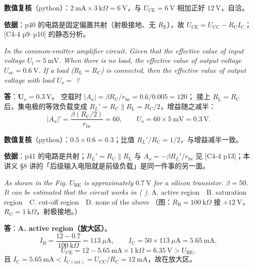 \documentclass[11pt]{ctexart}
\begin{document}
\textbf{数值复核}（python）：$2\ \mathrm{mA}\times3\ \mathrm{k}\Omega=6\ \mathrm{V}$，与 $U_{\mathrm{CE}}=6\ \mathrm{V}$
相加正好 $12\ \mathrm{V}$，自洽。

\textbf{依据}：p40 的电路是固定偏置共射（射极接地、无 $R_{\mathrm{E}}$），故
$U_{\mathrm{CE}}=U_{\mathrm{CC}}-R_{\mathrm{C}}I_{\mathrm{C}}$；[C4-4 p9--p10] 的静态分析。


\textit{In the common-emitter amplifier circuit. Given that the effective value of input voltage $U_{\mathrm{i}}=5\ \mathrm{mV}$.
When there is no load, the effective value of output voltage $U_{\mathrm{oc}}=0.6\ \mathrm{V}$.
If a load ($R_{\mathrm{L}}=R_{\mathrm{C}}$) is connected, then the effective value of output voltage with load $U_{\mathrm{o}}=$ ?}

\textbf{答}：$\mathbf{U_{\mathrm{o}}=0.3\ \mathrm{V}}$。
空载时 $|A_u|=\beta R_{\mathrm{C}}/r_{\mathrm{be}}=0.6/0.005=120$；
接上 $R_{\mathrm{L}}=R_{\mathrm{C}}$ 后，集电极的等效负载变成
$R_L'=R_{\mathrm{C}}\parallel R_{\mathrm{L}}=R_{\mathrm{C}}/2$，增益随之减半：
\[
|A_u|'=\frac{\beta (R_{\mathrm{C}}/2)}{r_{\mathrm{be}}}=60,\qquad
U_{\mathrm{o}}=60\times5\ \mathrm{mV}=0.3\ \mathrm{V}.
\]

\textbf{数值复核}（python）：$0.5\times0.6=0.3$；比值 $R_L'/R_{\mathrm{C}}=1/2$，与增益减半一致。

\textbf{依据}：p41 的电路是共射；$R_L'=R_{\mathrm{C}}\parallel R_{\mathrm{L}}$ 与 $A_u=-\beta R_L'/r_{\mathrm{be}}$
见 [C4-4 p13]；本讲义 §8 讲的「后级输入电阻就是前级负载」是同一件事的另一面。


\textit{As shown in the Fig. $U_{\mathrm{BE}}$ is approximately $0.7\ \mathrm{V}$ for a silicon transistor. $\beta=50$.
It can be estimated that the circuit works in ( ).}
A. active region　B. saturation region　C. cut-off region　D. none of the above
（图：$R_{\mathrm{B}}=100\ \mathrm{k}\Omega$ 接 $+12\ \mathrm{V}$，$R_{\mathrm{C}}=1\ \mathrm{k}\Omega$，射极接地。）

\textbf{答}：\textbf{A. active region（放大区）}。
\[
I_{\mathrm{B}}=\frac{12-0.7}{100\ \mathrm{k}\Omega}=113\ \mu\mathrm{A},\qquad
I_{\mathrm{C}}=50\times113\ \mu\mathrm{A}=5.65\ \mathrm{mA},
\]
\[
U_{\mathrm{CE}}=12-5.65\ \mathrm{mA}\times1\ \mathrm{k}\Omega=6.35\ \mathrm{V}>U_{\mathrm{BE}},
\]
且 $I_{\mathrm{C}}=5.65\ \mathrm{mA}<I_{\mathrm{C(sat)}}=U_{\mathrm{CC}}/R_{\mathrm{C}}=12\ \mathrm{mA}$，故在放大区。
\end{document}
